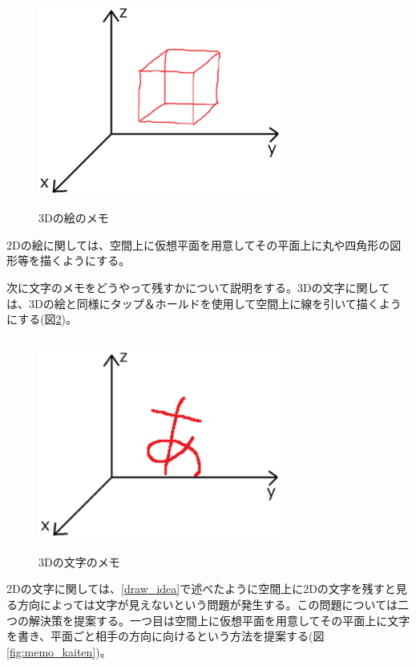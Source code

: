 \documentclass[11pt,a4j, titlepage]{jarticle} %
\begin{document}
\begin{figure}[H]
  \begin{center}
    \includegraphics[clip,height=7.0cm,width=8.0cm]{./3d_draw.eps}
    \caption{3Dの絵のメモ}
    \label{fig:3d_draw}
  \end{center}
\end{figure}

2Dの絵に関しては、空間上に仮想平面を用意してその平面上に丸や四角形の図形等を描くようにする。

次に文字のメモをどうやって残すかについて説明をする。3Dの文字に関しては、3Dの絵と同様にタップ＆ホールドを使用して空間上に線を引いて描くようにする(図\ref{fig:3d_moji})。

\begin{figure}[H]
  \begin{center}
    \includegraphics[clip,height=7.0cm,width=8.0cm]{./3d_moji.eps}
    \caption{3Dの文字のメモ}
    \label{fig:3d_moji}
  \end{center}
\end{figure}

2Dの文字に関しては、\ref{draw_idea}で述べたように空間上に2Dの文字を残すと見る方向によっては文字が見えないという問題が発生する。この問題については二つの解決策を提案する。一つ目は空間上に仮想平面を用意してその平面上に文字を書き、平面ごと相手の方向に向けるという方法を提案する(図\ref{fig:memo_kaiten})。
\end{document}

